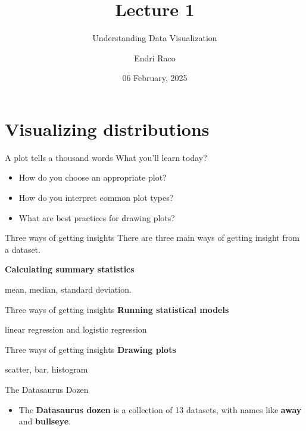 \documentclass[
  ignorenonframetext,
]{beamer}
\title{Lecture 1}
\subtitle{Understanding Data Visualization}
\author{Endri Raco}
\date{06 February, 2025}
\providecommand{\tightlist}{%
  \setlength{\itemsep}{0pt}\setlength{\parskip}{0pt}}
\begin{document}
\frame{\titlepage}

\begin{frame}[allowframebreaks]
  \tableofcontents[hideallsubsections]
\end{frame}
\section{Visualizing distributions}\label{visualizing-distributions}

\begin{frame}{A plot tells a thousand words}
\label{a-plot-tells-a-thousand-words}
What you'll learn today?

\begin{itemize}
\item
  How do you choose an appropriate plot?
\item
  How do you interpret common plot types?
\item
  What are best practices for drawing plots?
\end{itemize}
\end{frame}

\begin{frame}{Three ways of getting insights}
\label{three-ways-of-getting-insights}
There are three main ways of getting insight from a dataset.

\textbf{Calculating summary statistics}

mean, median, standard deviation.
\end{frame}

\begin{frame}{Three ways of getting insights}
\label{three-ways-of-getting-insights-1}
\textbf{Running statistical models}

linear regression and logistic regression
\end{frame}

\begin{frame}{Three ways of getting insights}
\label{three-ways-of-getting-insights-2}
\textbf{Drawing plots}

scatter, bar, histogram
\end{frame}

\begin{frame}{The Datasaurus Dozen}
\label{the-datasaurus-dozen}
\begin{itemize}
\tightlist
\item
  The \textbf{Datasaurus dozen} is a collection of 13 datasets, with
  names like \textbf{away} and \textbf{bullseye}.
\end{itemize}
\end{frame}
\end{document}
